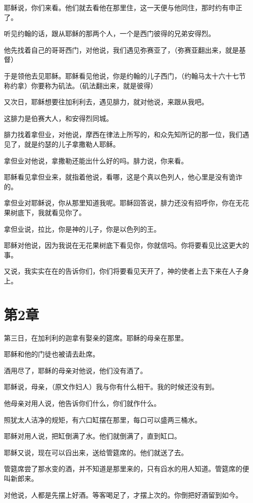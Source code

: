 \documentclass[12pt,oneside]{book}
\begin{document}
耶稣说，你们来看。他们就去看他在那里住，这一天便与他同住，那时约有申正了。

听见约翰的话，跟从耶稣的那两个人，一个是西门彼得的兄弟安得烈。

他先找着自己的哥哥西门，对他说，我们遇见弥赛亚了，（弥赛亚翻出来，就是基督）

于是领他去见耶稣。耶稣看见他说，你是约翰的儿子西门，（约翰马太十六十七节称约拿）你要称为矶法。（矶法翻出来，就是彼得）

又次日，耶稣想要往加利利去，遇见腓力，就对他说，来跟从我吧。

这腓力是伯赛大人，和安得烈同城。

腓力找着拿但业，对他说，摩西在律法上所写的，和众先知所记的那一位，我们遇见了，就是约瑟的儿子拿撒勒人耶稣。

拿但业对他说，拿撒勒还能出什么好的吗。腓力说，你来看。

耶稣看见拿但业来，就指着他说，看哪，这是个真以色列人，他心里是没有诡诈的。

拿但业对耶稣说，你从那里知道我呢。耶稣回答说，腓力还没有招呼你，你在无花果树底下，我就看见你了。

拿但业说，拉比，你是神的儿子，你是以色列的王。

耶稣对他说，因为我说在无花果树底下看见你，你就信吗。你将要看见比这更大的事。

又说，我实实在在的告诉你们，你们将要看见天开了，神的使者上去下来在人子身上。

\chapter{第2章}
第三日，在加利利的迦拿有娶亲的筵席。耶稣的母亲在那里。

耶稣和他的门徒也被请去赴席。

酒用尽了，耶稣的母亲对他说，他们没有酒了。

耶稣说，母亲，（原文作妇人）我与你有什么相干。我的时候还没有到。

他母亲对用人说，他告诉你们什么，你们就作什么。

照犹太人洁净的规矩，有六口缸摆在那里，每口可以盛两三桶水。

耶稣对用人说，把缸倒满了水。他们就倒满了，直到缸口。

耶稣又说，现在可以舀出来，送给管筵席的。他们就送了去。

管筵席尝了那水变的酒，并不知道是那里来的，只有舀水的用人知道。管筵席的便叫新郎来。

对他说，人都是先摆上好酒。等客喝足了，才摆上次的。你倒把好酒留到如今。
\end{document}
